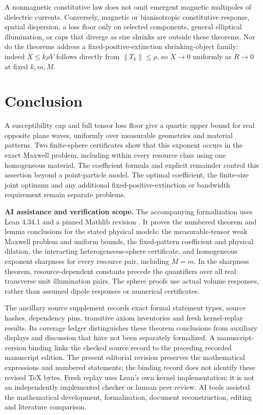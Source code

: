 \documentclass[11pt]{article}
\newcommand{\norm}[1]{\lVert #1\rVert}
\begin{document}
A nonmagnetic constitutive law does not omit emergent magnetic multipoles of dielectric currents. Conversely, magnetic or bianisotropic constitutive response, spatial dispersion, a loss floor only on selected components, general elliptical illumination, or caps that diverge as size shrinks are outside these theorems. Nor do the theorems address a fixed-positive-extinction shrinking-object family: indeed $X\leq k\rho V$ follows directly from $\norm{T_k}\leq\rho$, so $X\to0$ uniformly as $R\to0$ at fixed $k,m,M$.

\section{Conclusion}
A susceptibility cap and full tensor loss floor give a quartic upper bound for real opposite plane waves, uniformly over measurable geometries and material patterns. Two finite-sphere certificates show that this exponent occurs in the exact Maxwell problem, including within every resource class using one homogeneous material. The coefficient formula and explicit remainder control this assertion beyond a point-particle model. The optimal coefficient, the finite-size joint optimum and any additional fixed-positive-extinction or bandwidth requirement remain separate problems.

\noindent\textbf{AI assistance and verification scope.}
The accompanying formalization uses Lean 4.34.1 \citep{deMouraUllrich2021} and a pinned Mathlib revision \citep{mathlib2020}. It proves the numbered theorem and lemma conclusions for the stated physical models: the measurable-tensor weak Maxwell problem and uniform bounds, the fixed-pattern coefficient and physical dilation, the interacting heterogeneous-sphere certificate, and homogeneous exponent sharpness for every resource pair, including $M=m$. In the sharpness theorem, resource-dependent constants precede the quantifiers over all real transverse unit illumination pairs. The sphere proofs use actual volume responses, rather than assumed dipole responses or numerical certificates.

The ancillary source supplement records exact formal statement types, source hashes, dependency pins, transitive axiom inventories and fresh kernel-replay results. Its coverage ledger distinguishes these theorem conclusions from auxiliary displays and discussion that have not been separately formalized. A manuscript-version binding links the checked source record to the preceding recorded manuscript edition. The present editorial revision preserves the mathematical expressions and numbered statements; the binding record does not identify these revised TeX bytes. Fresh replay uses Lean's own kernel implementation; it is not an independently implemented checker or human peer review. AI tools assisted the mathematical development, formalization, document reconstruction, editing and literature comparison.
\end{document}
